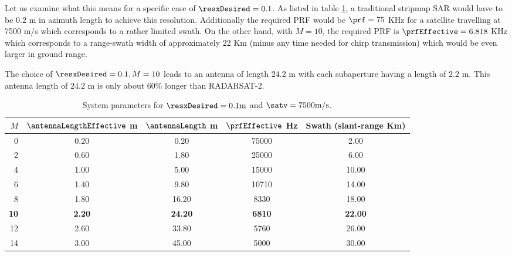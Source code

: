 Let us examine what this means for a specific case of $\resxDesired = 0.1$. As listed in table \ref{tb:Simulation}, a traditional stripmap SAR would have to be $0.2$ m in azimuth length to achieve this resolution. Additionally the required PRF would be $\prf = 75$ KHz for a satellite travelling at 7500 m/s which corresponds to a rather limited swath. On the other hand, with $M=10$, the required PRF is $\prfEffective = 6.818$ KHz which corresponds to a range-swath width of approximately 22 Km (minus any time needed for chirp transmission) which would be even larger in ground range.
\par
The choice of $\resxDesired=0.1, M=10$ leads to an antenna of length $24.2$ m with each subaperture having a length of $2.2$ m. This antenna length of $24.2$ m is only about $60$\% longer than RADARSAT-2.
\begin{table}[h!]
\begin{center}
\caption{System parameters for $\resxDesired=0.1 \text{m}$ and $\satv=7500 \text{m/s}$.}
\label{tb:Simulation}
 \begin{tabular}{r|c|c|c|c}\\\hline
  {\bf $M$} & {\bf $\antennaLengthEffective$ m} & {\bf $\antennaLength$ m} & {\bf $\prfEffective$ Hz} & {\bf Swath (slant-range Km)}\\\hline 
0 & 0.20 & 0.20 & 75000 & 2.00\\\hline
2 & 0.60 & 1.80 & 25000 & 6.00\\\hline
4 & 1.00 & 5.00 & 15000 & 10.00\\\hline
6 & 1.40 & 9.80 & 10710 & 14.00\\\hline
8 & 1.80 & 16.20 & 8330 & 18.00\\\hline
{\bf 10} & {\bf 2.20} & {\bf 24.20} & {\bf 6810} & {\bf 22.00}\\\hline
12 & 2.60 & 33.80 & 5760 & 26.00\\\hline
14 & 3.00 & 45.00 & 5000 & 30.00\\\hline
 \end{tabular}
 \end{center}
\end{table}
